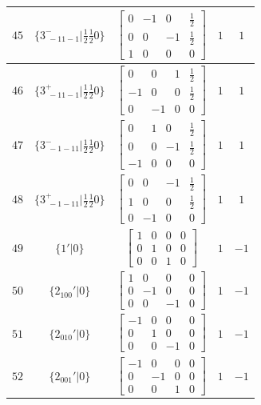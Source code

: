 \documentclass[fleqn,8pt]{jsarticle}
\begin{document}
\begin{longtable}{ccccc}
$ 45 $ & $ \{3^{-}_{\,\,-11-1}|\frac{1}{2} \frac{1}{2} 0\} $ & $ \begin{bmatrix} 0 & -1 & 0 & \frac{1}{2} \\ 0 & 0 & -1 & \frac{1}{2} \\ 1 & 0 & 0 & 0 \end{bmatrix} $ & $ 1 $ & $ 1 $ \\ \hline
$ 46 $ & $ \{3^{+}_{\,\,-11-1}|\frac{1}{2} \frac{1}{2} 0\} $ & $ \begin{bmatrix} 0 & 0 & 1 & \frac{1}{2} \\ -1 & 0 & 0 & \frac{1}{2} \\ 0 & -1 & 0 & 0 \end{bmatrix} $ & $ 1 $ & $ 1 $ \\ \hline
$ 47 $ & $ \{3^{-}_{\,\,-1-11}|\frac{1}{2} \frac{1}{2} 0\} $ & $ \begin{bmatrix} 0 & 1 & 0 & \frac{1}{2} \\ 0 & 0 & -1 & \frac{1}{2} \\ -1 & 0 & 0 & 0 \end{bmatrix} $ & $ 1 $ & $ 1 $ \\ \hline
$ 48 $ & $ \{3^{+}_{\,\,-1-11}|\frac{1}{2} \frac{1}{2} 0\} $ & $ \begin{bmatrix} 0 & 0 & -1 & \frac{1}{2} \\ 1 & 0 & 0 & \frac{1}{2} \\ 0 & -1 & 0 & 0 \end{bmatrix} $ & $ 1 $ & $ 1 $ \\ \hline
$ 49 $ & $ \{1{}'|0\} $ & $ \begin{bmatrix} 1 & 0 & 0 & 0 \\ 0 & 1 & 0 & 0 \\ 0 & 0 & 1 & 0 \end{bmatrix} $ & $ 1 $ & $ -1 $ \\ \hline
$ 50 $ & $ \{2{}_{100}{}'|0\} $ & $ \begin{bmatrix} 1 & 0 & 0 & 0 \\ 0 & -1 & 0 & 0 \\ 0 & 0 & -1 & 0 \end{bmatrix} $ & $ 1 $ & $ -1 $ \\ \hline
$ 51 $ & $ \{2{}_{010}{}'|0\} $ & $ \begin{bmatrix} -1 & 0 & 0 & 0 \\ 0 & 1 & 0 & 0 \\ 0 & 0 & -1 & 0 \end{bmatrix} $ & $ 1 $ & $ -1 $ \\ \hline
$ 52 $ & $ \{2{}_{001}{}'|0\} $ & $ \begin{bmatrix} -1 & 0 & 0 & 0 \\ 0 & -1 & 0 & 0 \\ 0 & 0 & 1 & 0 \end{bmatrix} $ & $ 1 $ & $ -1 $ \\ \hline

\end{longtable}
\end{document}
